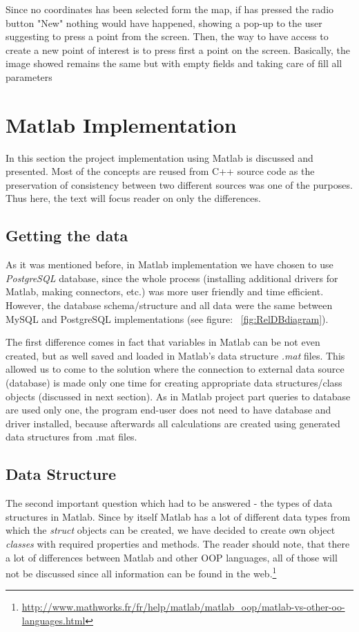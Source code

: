 \documentclass{article}
\begin{document}
Since no coordinates has been selected form the map, if has pressed the radio button "New" nothing would have happened, showing a pop-up to the user suggesting to press a point from the screen. Then, the way to have access to create a new point of interest is to press first a point on the screen. Basically, the image showed remains the same but with empty fields and taking care of fill all parameters

\clearpage
\section{Matlab Implementation}
       
In this section the project implementation using Matlab is discussed and presented. Most of the concepts are reused from C++ source code as the preservation of consistency between two different sources was one of the purposes. Thus here, the text will focus reader on only the differences.

\subsection{Getting the data}

As it was mentioned before, in Matlab implementation we have chosen to use \textit{PostgreSQL} database, since the whole process (installing additional drivers for Matlab, making connectors, etc.) was more user friendly and time efficient. However, the database schema/structure and all data were the same between MySQL and PostgreSQL implementations (see figure: ~\ref{fig:RelDBdiagram}).

The first difference comes in fact that variables in Matlab can be not even created, but as well saved and loaded in Matlab's data structure \textit{.mat} files. This allowed us to come to the solution where the connection to external data source (database) is made only one time for creating appropriate data structures/class objects (discussed in next section). As in Matlab project part queries to database are used only one, the program end-user does not need to have database and driver installed, because afterwards all calculations are created using generated data structures from .mat files.

\subsection{Data Structure}

The second important question which had to be answered - the types of data structures in Matlab.
Since by itself Matlab has a lot of different data types from which the \textit{struct} objects can be created, we have decided to create own object \textit{classes} with required properties and methods. The reader should note, that there a lot of differences between Matlab and other OOP languages, all of those will not be discussed since all information can be found in the web.\footnote{
\url{http://www.mathworks.fr/fr/help/matlab/matlab_oop/matlab-vs-other-oo-languages.html}
}
\end{document}
